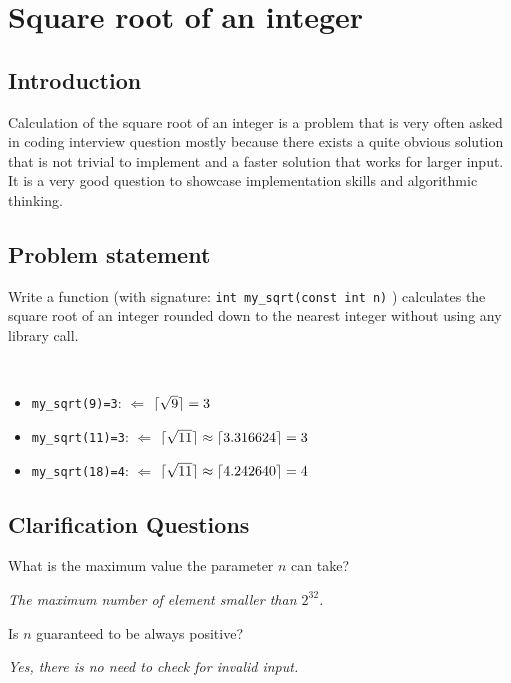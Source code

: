 %


\chapter{Square root of an integer}
\label{ch:square_root}
\section*{Introduction}
Calculation of the square root of an integer is a problem that is very often asked in coding interview question mostly because there exists a quite obvious solution that is not trivial to implement and a faster solution that works for larger input. It is a very good question to showcase implementation skills and algorithmic thinking.

\section{Problem statement}
	\begin{exercise}
	Write a function (with signature: \lstinline[columns=fixed]{int my_sqrt(const int n)} ) calculates the square root of an integer rounded down to the nearest integer without using any library call.

	\begin{example}
		\hfill \\
		\begin{itemize}
			\item[-] 	\lstinline[columns=fixed]{my_sqrt(9)=3}: $\Longleftarrow $ $\lceil\sqrt{9}\rceil=3$
			\item[-] 	\lstinline[columns=fixed]{my_sqrt(11)=3}: $\Longleftarrow $ $\lceil\sqrt{11}\rceil\approx\lceil3.316624\rceil=3$
			\item[-] 	\lstinline[columns=fixed]{my_sqrt(18)=4}: $\Longleftarrow $ $\lceil\sqrt{11}\rceil\approx\lceil4.242640\rceil=4$
		\end{itemize}

	\end{example}
\end{exercise}
\section{Clarification Questions}

\begin{QandA}
	\item What is the maximum value the parameter $n$ can take?
	\begin{answered}
		\textit{The maximum number of element smaller than $2^{32}$.}
	\end{answered}
	
	\item Is $n$ guaranteed to be always positive?
	\begin{answered}
		\textit{Yes, there is no need to check for invalid input.}
	\end{answered}
\end{QandA}

